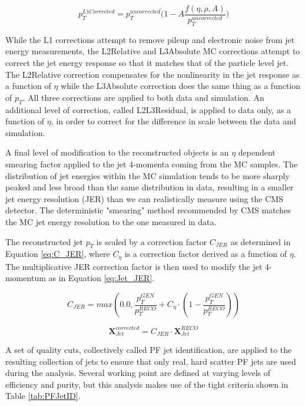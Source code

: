 \begin{equation}
\label{pileupeq}
p_{T}^{L1Corrected} = p_{T}^{uncorrected}\dot(1 - A\frac{f(\eta,\rho,A)}{p_{T}^{uncorrected}})
\end{equation}

While the L1 corrections attempt to remove pileup and electronic noise from jet energy measurements, the L2Relative and L3Absolute MC corrections attempt to correct the jet energy response so that it matches that of the particle level jet. The L2Relative correction compensates for the nonlinearity in the jet response as a function of $\eta$ while the L3Absolute correction does the same thing as a function of $p_{T}$. All three corrections are applied to both data and simulation. An additional level of correction, called L2L3Residual, is applied to data only, as a function of $\eta$, in order to correct for the difference in scale between the data and simulation.

A final level of modification to the reconstructed objects is an $\eta$ dependent smearing factor applied to the jet 4-momenta coming from the MC samples. The distribution of jet energies within the MC simulation tends to be more sharply peaked and less broad than the same distribution in data, resulting in a smaller jet energy resolution (JER) than we can realistically measure using the CMS detector. The deterministic "smearing" method recommended by CMS\cite{JetEnergyResolutionTwiki} matches the MC jet energy resolution to the one measured in data. 

The reconstructed jet $p_{T}$ is scaled by a correction factor $C_{JER}$ as determined in Equation \ref{eq:C_JER}, where $C_{\eta}$ is a correction factor derived as a function of $\eta$. The multiplicative JER correction factor is then used to modify the jet 4-momentum as in Equation \ref{eq:Jet_JER}.

\begin{equation}
\label{eq:C_JER}
C_{JER}=max\left(0.0,\frac{p_{T}^{GEN}}{p_{T}^{RECO}}+C_{\eta}\cdot\left(1-\frac{p_{T}^{GEN}}{p_{T}^{RECO}}\right)\right)
\end{equation}

\begin{equation}
\label{eq:Jet_JER}
\textbf{X}_{Jet}^{corrected}=C_{JER}{\cdot}\textbf{X}_{Jet}^{RECO}
\end{equation}

A set of quality cuts, collectively called PF jet identification, are applied to the resulting collection of jets to ensure that only real, hard scatter PF jets are used during the analysis\cite{CMS-AN-2010-003}. Several working point are defined at varying levels of efficiency and purity, but this analysis makes use of the tight criteria shown in Table \ref{tab:PFJetID}\cite{PFJetID}.

